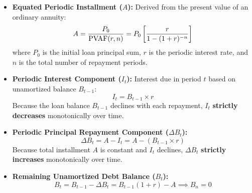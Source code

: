 \begin{formulabox}
\begin{itemize}[leftmargin=*, noitemsep]
    \item \textbf{Equated Periodic Installment ($A$):} Derived from the present value of an ordinary annuity:
    \begin{equation}
        A = \frac{P_0}{\operatorname{PVAF}(r, n)} = P_0 \left[ \frac{r}{1 - (1 + r)^{-n}} \right]
    \end{equation}
    where $P_0$ is the initial loan principal sum, $r$ is the periodic interest rate, and $n$ is the total number of repayment periods.

    \item \textbf{Periodic Interest Component ($I_t$):} Interest due in period $t$ based on unamortized balance $B_{t-1}$:
    \begin{equation}
        I_t = B_{t-1} \times r
    \end{equation}
    Because the loan balance $B_{t-1}$ declines with each repayment, $I_t$ \textbf{strictly decreases} monotonically over time.

    \item \textbf{Periodic Principal Repayment Component ($\Delta B_t$):}
    \begin{equation}
        \Delta B_t = A - I_t = A - (B_{t-1} \times r)
    \end{equation}
    Because total installment $A$ is constant and $I_t$ declines, $\Delta B_t$ \textbf{strictly increases} monotonically over time.

    \item \textbf{Remaining Unamortized Debt Balance ($B_t$):}
    \begin{equation}
        B_t = B_{t-1} - \Delta B_t = B_{t-1}(1 + r) - A \implies B_n = 0
    \end{equation}
\end{itemize}
\end{formulabox}

